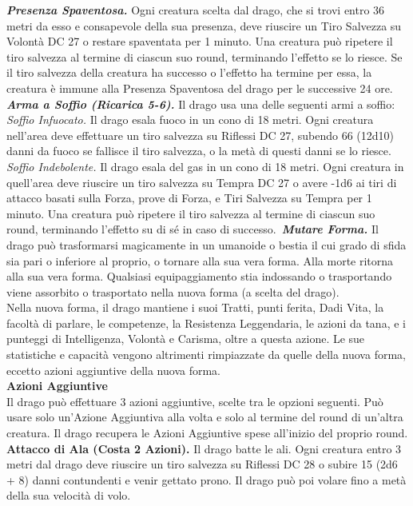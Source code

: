 \begin{multicols}{2}
\emph{\textbf{Presenza Spaventosa.}} Ogni creatura scelta dal drago, che si trovi entro 36 metri da esso e consapevole della sua presenza, deve riuscire un Tiro Salvezza su Volontà DC  27 o restare spaventata per 1 minuto. Una creatura può ripetere il tiro salvezza al termine di ciascun suo round, terminando l'effetto se lo riesce. Se il tiro salvezza della creatura ha successo o l'effetto ha termine per essa, la creatura è immune alla Presenza Spaventosa del drago per le successive 24 ore.\\
\emph{\textbf{Arma a Soffio (Ricarica 5-6).}} Il drago usa una delle seguenti armi a soffio:\\
\emph{Soffio Infuocato.} Il drago esala fuoco in un cono di 18 metri. Ogni creatura nell'area deve effettuare un tiro salvezza su Riflessi DC  27, subendo 66 (12d10) danni da fuoco se fallisce il tiro salvezza, o la metà di questi danni se lo riesce.\\
\emph{Soffio Indebolente.} Il drago esala del gas in un cono di 18 metri. Ogni creatura in quell'area deve riuscire un tiro salvezza su Tempra DC  27 o avere -1d6 ai tiri di attacco basati sulla Forza, prove di Forza, e Tiri Salvezza su Tempra per 1 minuto. Una creatura può ripetere il tiro salvezza al termine di ciascun suo round, terminando l'effetto su di sé in caso di successo.\
\emph{\textbf{Mutare Forma.}} Il drago può trasformarsi magicamente in un umanoide o bestia il cui grado di sfida sia pari o inferiore al proprio, o tornare alla sua vera forma. Alla morte ritorna alla sua vera forma. Qualsiasi equipaggiamento stia indossando o trasportando viene assorbito o trasportato nella nuova forma (a scelta del drago).\\
Nella nuova forma, il drago mantiene i suoi Tratti, punti ferita, Dadi Vita, la facoltà di parlare, le competenze, la Resistenza Leggendaria, le azioni da tana, e i punteggi di Intelligenza, Volontà e Carisma, oltre a questa azione. Le sue statistiche e capacità  vengono altrimenti rimpiazzate da quelle della nuova forma, eccetto azioni aggiuntive della nuova forma.\\
\textbf{Azioni Aggiuntive}\\
Il drago può effettuare 3 azioni aggiuntive, scelte tra le opzioni seguenti. Può usare solo un'Azione Aggiuntiva alla volta e solo al termine del round di un'altra creatura. Il drago recupera le Azioni Aggiuntive spese all'inizio del proprio round.\\
\textbf{Attacco di Ala (Costa 2 Azioni).} Il drago batte le ali. Ogni creatura entro 3 metri dal drago deve riuscire un tiro salvezza su Riflessi DC  28 o subire 15 (2d6 + 8) danni contundenti e venir gettato prono. Il drago può poi volare fino a metà della sua velocità di volo.\\

\end{multicols}
